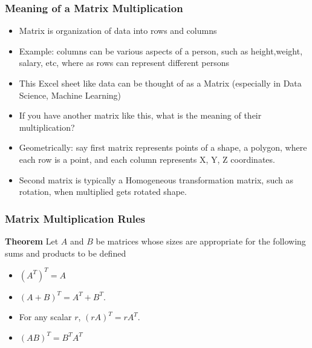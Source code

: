 \begin{frame}[fragile]\frametitle{Meaning of a Matrix Multiplication}

 \begin{itemize}
  \item Matrix is organization of data into rows and columns
  \item Example: columns can be various aspects of a person, such as height,weight, salary, etc, where as rows can represent different persons 
  \item This Excel sheet like data can be thought of as a Matrix (especially in Data Science, Machine Learning)
  \item If you have another matrix like this, what is the meaning of their multiplication?
  \item Geometrically: say first matrix represents points of a shape, a polygon, where each row is a point, and each column represents X, Y, Z coordinates.
  \item Second matrix is typically a Homogeneous transformation matrix, such as rotation,  when multiplied gets rotated shape.
 \end{itemize}

\end{frame}

\begin{frame}[fragile]\frametitle{Matrix Multiplication Rules}
\textbf{Theorem}  Let $A$ and $B$ be matrices whose sizes are appropriate for the following 
sums and products to be defined
 \begin{itemize}
  \item $(A^T)^T = A$
\item $(A+B)^T = A^T + B^T$.
\item For any scalar $r$, $(rA)^T=rA^T$.
\item $(AB)^T = B^T A^T$
 \end{itemize}


\end{frame}


